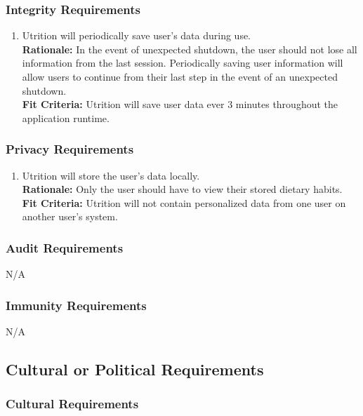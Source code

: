 \documentclass[12pt]{article}
\begin{document}
\subsubsection{Integrity Requirements}
\begin{enumerate}[{SR}2. ] 
	\item Utrition will periodically save user’s data during use. \\
\textbf{Rationale:} In the event of unexpected shutdown, the user should 
not lose all information from the last session. Periodically saving user 
information will allow users to continue from their last step in the event 
of an unexpected shutdown. \\	
	\textbf{Fit Criteria:} Utrition will save user data ever 3 minutes throughout the 
	application runtime.
\end{enumerate}

\subsubsection{Privacy Requirements}
\begin{enumerate}[{SR}3. ] 
	\item Utrition will store the user’s data locally.\\
	\textbf{Rationale:} Only the user should have to view their stored dietary habits. \\	
	\textbf{Fit Criteria:} Utrition will not contain personalized data from one user on another user's system.
\end{enumerate}

\subsubsection{Audit Requirements}
\hspace{1.5cm}N/A 

\subsubsection{Immunity Requirements}
\hspace{1.5cm}N/A 

\subsection{Cultural or Political Requirements}

\subsubsection{Cultural Requirements}
\end{document}
